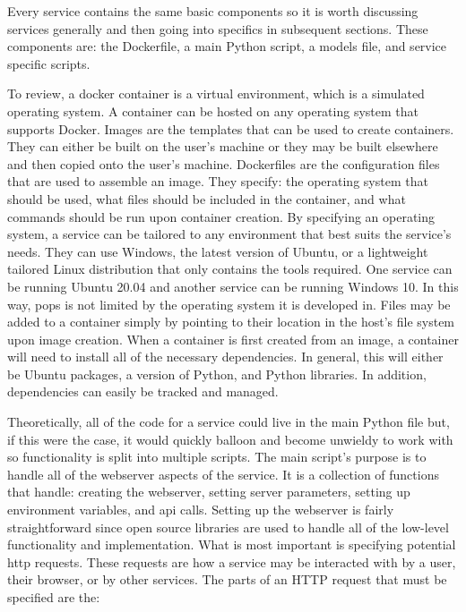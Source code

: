 Every service contains the same basic components so it is worth discussing
services generally and then going into specifics in subsequent sections. These
components are: the Dockerfile, a main Python script, a models file, and
service specific scripts.

To review, a docker container is a virtual environment, which is a simulated
operating system. A container can be hosted on any operating system that
supports Docker. Images are the templates that can be used to create
containers. They can either be built on the user's machine or they may be built
elsewhere and then copied onto the user's machine. Dockerfiles are the
configuration files that are used to assemble an image. They specify: the
operating system that should be used, what files should be included in the
container, and what commands should be run upon container creation. By
specifying an operating system, a service can be tailored to any environment
that best suits the service's needs.  They can use Windows, the latest version
of Ubuntu, or a lightweight tailored Linux distribution that only contains the
tools required. One service can be running Ubuntu 20.04 and another service can
be running Windows 10. In this way, \gls{pops} is not limited by the operating
system it is developed in.  Files may be added to a container simply by
pointing to their location in the host's file system upon image creation. When
a container is first created from an image, a container will need to install
all of the necessary dependencies. In general, this will either be Ubuntu
packages, a version of Python, and Python libraries.  In addition, dependencies
can easily be tracked and managed. 

Theoretically, all of the code for a service could live in the main Python file
but, if this were the case, it would quickly balloon and become unwieldy to
work with so functionality is split into multiple scripts. The main script's
purpose is to handle all of the webserver aspects of the service. It is a
collection of functions that handle: creating the webserver, setting server
parameters, setting up environment variables, and \gls{api} calls.  Setting up
the webserver is fairly straightforward since open source libraries are used to
handle all of the low-level functionality and implementation. What is most
important is specifying potential \gls{http} requests. These requests are how a
service may be interacted with by a user, their browser, or by other services.
The parts of an HTTP request that must be specified are the: 

